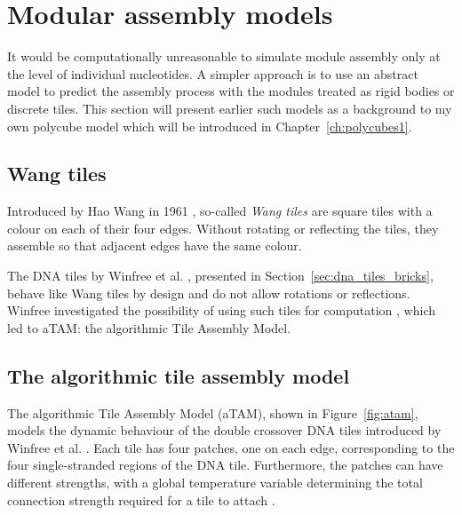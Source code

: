 \section{Modular assembly models}
It would be computationally unreasonable to simulate module assembly only at the level of individual nucleotides. A simpler approach is to use an abstract model to predict the assembly process with the modules treated as rigid bodies or discrete tiles. This section will present earlier such models as a background to my own polycube model which will be introduced in Chapter~\ref{ch:polycubes1}.

\subsection{Wang tiles}
Introduced by Hao Wang in 1961 \cite{wang1961proving}, so-called \emph{Wang tiles} are square tiles with a colour on each of their four edges. Without rotating or reflecting the tiles, they assemble so that adjacent edges have the same colour.


The DNA tiles by Winfree et al. \cite{winfree1998design}, presented in Section~\ref{sec:dna_tiles_bricks}, behave like Wang tiles by design and do not allow rotations or reflections. Winfree investigated the possibility of using such tiles for computation \cite{winfree1998algorithmic}, which led to aTAM: the algorithmic Tile Assembly Model.

\subsection{The algorithmic tile assembly model}
\label{sec:atam}


The algorithmic Tile Assembly Model (aTAM), shown in Figure~\ref{fig:atam}, models the dynamic behaviour of the double crossover DNA tiles introduced by Winfree et al. \cite{winfree1998design}. Each tile has four patches, one on each edge, corresponding to the four single-stranded regions of the DNA tile. Furthermore, the patches can have different strengths, with a global temperature variable determining the total connection strength required for a tile to attach \cite{doty2012theory}.


